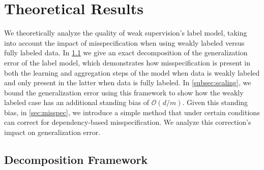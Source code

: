 \section{Theoretical Results} \label{sec:theory}

We theoretically analyze the quality of weak supervision's label model, taking into account the impact of misspecification when using weakly labeled versus fully labeled data. %
In \ref{subsec:decomp} we give 
an exact decomposition of the generalization error of the label model, which demonstrates how misspecification is present in both the learning and aggregation steps of the model when data is weakly labeled and only present in the latter when data is fully labeled. In \ref{subsec:scaling}, we bound the generalization error using this framework to show how the weakly labeled case has an additional standing bias of $\mathcal{O}(d/m)$. Given this standing bias, in \ref{sec:misspec}, we introduce a simple method that under certain conditions can correct for dependency-based misspecification. We analyze this correction's impact on generalization error. 




\subsection{Decomposition Framework}
\label{subsec:decomp}%


